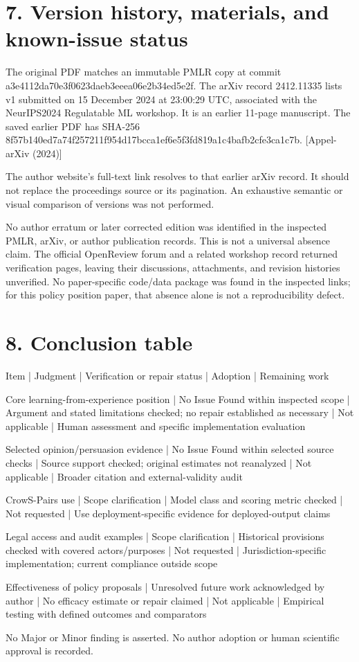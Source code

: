 \documentclass[10pt]{article}
\begin{document}
\section*{7. Version history, materials, and known-issue status}
The original PDF matches an immutable PMLR copy at commit a3e4112da70e3f0623daeb3eeea06e2b34ed5e2f. The arXiv record 2412.11335 lists v1 submitted on 15 December 2024 at 23:00:29 UTC, associated with the NeurIPS2024 Regulatable ML workshop. It is an earlier 11-page manuscript. The saved earlier PDF has SHA-256 8f57b140ed7a74f257211f954d17bcca1ef6e5f3fd819a1c4bafb2cfe3ca1c7b. [Appel-arXiv (2024)]\par
The author website’s full-text link resolves to that earlier arXiv record. It should not replace the proceedings source or its pagination. An exhaustive semantic or visual comparison of versions was not performed.\par
No author erratum or later corrected edition was identified in the inspected PMLR, arXiv, or author publication records. This is not a universal absence claim. The official OpenReview forum and a related workshop record returned verification pages, leaving their discussions, attachments, and revision histories unverified. No paper-specific code/data package was found in the inspected links; for this policy position paper, that absence alone is not a reproducibility defect.\par
\section*{8. Conclusion table}
Item | Judgment | Verification or repair status | Adoption | Remaining work\par
Core learning-from-experience position | No Issue Found within inspected scope | Argument and stated limitations checked; no repair established as necessary | Not applicable | Human assessment and specific implementation evaluation\par
Selected opinion/persuasion evidence | No Issue Found within selected source checks | Source support checked; original estimates not reanalyzed | Not applicable | Broader citation and external-validity audit\par
CrowS-Pairs use | Scope clarification | Model class and scoring metric checked | Not requested | Use deployment-specific evidence for deployed-output claims\par
Legal access and audit examples | Scope clarification | Historical provisions checked with covered actors/purposes | Not requested | Jurisdiction-specific implementation; current compliance outside scope\par
Effectiveness of policy proposals | Unresolved future work acknowledged by author | No efficacy estimate or repair claimed | Not applicable | Empirical testing with defined outcomes and comparators\par
No Major or Minor finding is asserted. No author adoption or human scientific approval is recorded.\par
\end{document}
